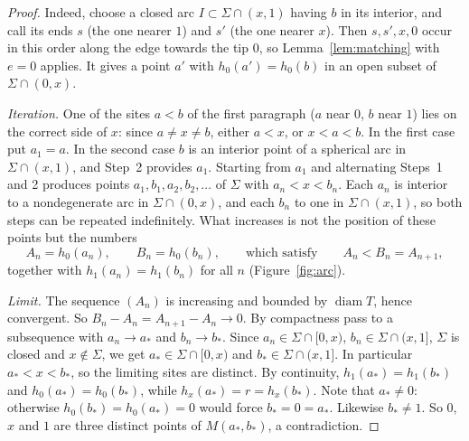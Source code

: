 \documentclass[11pt]{amsart}
\theoremstyle{definition}
\theoremstyle{remark}
\newcommand{\M}{M}
\newcommand{\diam}{\operatorname{diam}}
\begin{document}
\begin{proof}
Indeed, choose a closed arc $I\subset\Sigma\cap(x,1)$ having $b$ in its interior, and call its ends $s$ (the one nearer $1$) and $s'$ (the one nearer $x$). Then $s,s',x,0$ occur in this order along the edge towards the tip $0$, so Lemma~\ref{lem:matching} with $e=0$ applies. It gives a point $a'$ with $h_0(a')=h_0(b)$ in an open subset of $\Sigma\cap(0,x)$.

\emph{Iteration.} One of the sites $a<b$ of the first paragraph ($a$ near $0$, $b$ near $1$) lies on the correct side of $x$: since $a\ne x\ne b$, either $a<x$, or $x<a<b$. In the first case put $a_1=a$. In the second case $b$ is an interior point of a spherical arc in $\Sigma\cap(x,1)$, and Step~2 provides $a_1$. Starting from $a_1$ and alternating Steps~1 and 2 produces points $a_1,b_1,a_2,b_2,\dots$ of $\Sigma$ with $a_n<x<b_n$. Each $a_n$ is interior to a nondegenerate arc in $\Sigma\cap(0,x)$, and each $b_n$ to one in $\Sigma\cap(x,1)$, so both steps can be repeated indefinitely. What increases is not the position of these points but the numbers
\[
  A_n=h_0(a_n),\qquad B_n=h_0(b_n),\qquad\text{which satisfy}\qquad A_n<B_n=A_{n+1},
\]
together with $h_1(a_n)=h_1(b_n)$ for all $n$ (Figure~\ref{fig:arc}).

\emph{Limit.} The sequence $(A_n)$ is increasing and bounded by $\diam T$, hence convergent. So $B_n-A_n=A_{n+1}-A_n\to0$. By compactness pass to a subsequence with $a_n\to a_*$ and $b_n\to b_*$. Since $a_n\in\Sigma\cap[0,x)$, $b_n\in\Sigma\cap(x,1]$, $\Sigma$ is closed and $x\notin\Sigma$, we get $a_*\in\Sigma\cap[0,x)$ and $b_*\in\Sigma\cap(x,1]$. In particular $a_*<x<b_*$, so the limiting sites are distinct. By continuity, $h_1(a_*)=h_1(b_*)$ and $h_0(a_*)=h_0(b_*)$, while $h_x(a_*)=r=h_x(b_*)$. Note that $a_*\ne0$: otherwise $h_0(b_*)=h_0(a_*)=0$ would force $b_*=0=a_*$. Likewise $b_*\ne1$. So $0$, $x$ and $1$ are three distinct points of $\M(a_*,b_*)$, a contradiction.
\end{proof}
\end{document}
